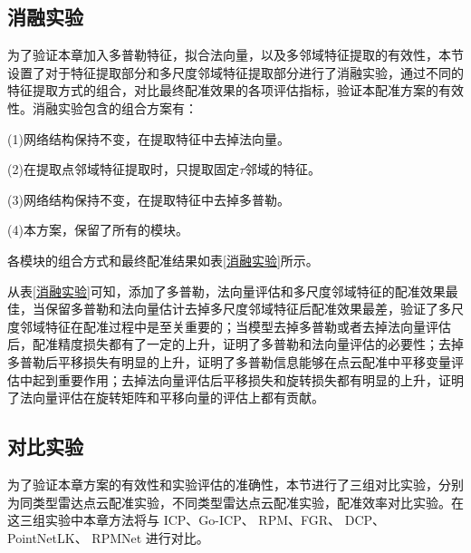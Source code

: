 \subsection{消融实验}
为了验证本章加入多普勒特征，拟合法向量，以及多邻域特征提取的有效性，本节设置了对于特征提取部分和多尺度邻域特征提取部分进行了消融实验，通过不同的特征提取方式的组合，对比最终配准效果的各项评估指标，验证本配准方案的有效性。消融实验包含的组合方案有：
\par
(1)网络结构保持不变，在提取特征中去掉法向量。
\par
(2)在提取点邻域特征提取时，只提取固定$\tau$邻域的特征。
\par
(3)网络结构保持不变，在提取特征中去掉多普勒。
\par
(4)本方案，保留了所有的模块。
\par
各模块的组合方式和最终配准结果如表\ref{消融实验}所示。
\
\begin{table}[htbp]
	\centering
	\caption{消融实验}
	\label{消融实验}
\end{table}
\par
从表\ref{消融实验}可知，添加了多普勒，法向量评估和多尺度邻域特征的配准效果最佳，当保留多普勒和法向量估计去掉多尺度邻域特征后配准效果最差，验证了多尺度邻域特征在配准过程中是至关重要的；当模型去掉多普勒或者去掉法向量评估后，配准精度损失都有了一定的上升，证明了多普勒和法向量评估的必要性；去掉多普勒后平移损失有明显的上升，证明了多普勒信息能够在点云配准中平移变量评估中起到重要作用；去掉法向量评估后平移损失和旋转损失都有明显的上升，证明了法向量评估在旋转矩阵和平移向量的评估上都有贡献。

\subsection{对比实验}
为了验证本章方案的有效性和实验评估的准确性，本节进行了三组对比实验，分别为同类型雷达点云配准实验，不同类型雷达点云配准实验，配准效率对比实验。在这三组实验中本章方法将与 ICP、Go-ICP、 RPM、FGR、 DCP、 PointNetLK、 RPMNet 进行对比。

